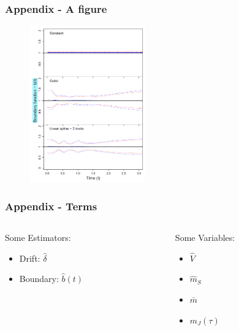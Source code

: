 \documentclass[
    11pt, %
    aspectratio=169, %
]{beamer}
\begin{document}
\begin{frame}[noframenumbering]
\label{Figure}
	\frametitle{Appendix - A figure}
        \hyperlink{Test}{}

        \begin{figure}[h!]
            \centering
            \includegraphics[angle=0, width=5cm]{Newey et al Graph.png}
        \end{figure}
\end{frame}

\begin{frame}[noframenumbering]
\label{Terms}
	\frametitle{Appendix - Terms}

        \begin{columns}[t] %
		\begin{column}{0.5\textwidth} %
                Some Estimators:
                \begin{itemize}
                    \item Drift: $\hat{\delta}$
                    \item Boundary: $\hat{b}(t)$
                \end{itemize}
		\end{column}
  		\begin{column}{0.5\textwidth} %
                Some Variables:
                \begin{itemize}
                    \item $\hat{V}$
                    \item $\hat{m}_S$
                    \item $\bar{m}$
                    \item $m_J(\tau)$\newline\newline
                \end{itemize}
		\end{column}
	\end{columns}
        \hyperlink{Test Stat}{}
\end{frame}
\end{document}
